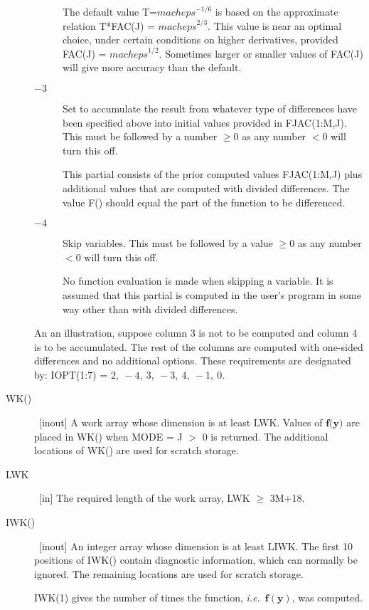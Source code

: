 \documentclass[twoside]{MATH77}
\begin{document}
\begin{description}
\begin{description}
  The default value T=$\mathit{macheps}^{-1/6}$ is based on the
  approximate relation T*FAC(J) = $\mathit{macheps}^{2/3}$.  This value
  is near an optimal choice, under certain conditions on higher derivatives,
  provided FAC(J) = $\mathit{macheps}^{1/2}$.  Sometimes larger or
  smaller values of FAC(J) will give more accuracy than the default.

  
\item[$-3$] Set to accumulate the result from whatever type of differences
  have been specified above into initial values provided in FJAC(1:M,J).
  This must be followed by a number $\geq 0$ as any number $< 0$ will turn
  this off.
  
  This partial consists of the prior computed values FJAC(1:M,J) plus
  additional values that are computed with divided differences. The value
  F() should equal the part of the function to be differenced.

\item[$-4$] Skip variables.  This must be followed by a value $\geq 0$ 
as any  number $< 0$ will turn this off.

No function evaluation is made when skipping a variable.  It is assumed that
this partial is computed in the user's program in some way other than with
divided differences.
\end{description}


An an illustration, suppose column 3 is not to be computed and column 4 is to
be accumulated.  The rest of the columns are computed with one-sided
differences and no additional options.  These requirements are designated by:
IOPT(1:7) = $2,\ -4,\ 3,\ -3,\ 4,\ -1,\ 0$.

\item[WK()] \ [inout] A work array whose dimension is at least LWK.
  Values of $\mathbf{f}(\mathbf{y)}$ are placed in WK() when MODE =
    J $>$ 0 is returned.  The additional locations of WK() are used for
  scratch storage.

\item[LWK] \ [in] The required length of the work array, LWK $\geq$ 3M+18.
  
\item[IWK()] \ [inout] An integer array whose dimension is at least LIWK.  The
  first 10 positions of IWK() contain diagnostic information, which can
  normally be ignored.  The remaining locations are used for scratch storage.
  
  IWK(1) gives the number of times the function, {\em i.e.}\ 
  $\mathbf{f}(\mathbf{y})$, was computed.
  

\end{description}
\end{document}
